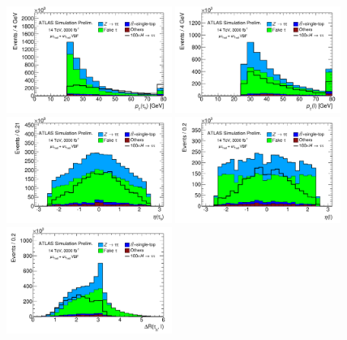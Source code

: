 \begin{figure}[tp]
  \centering
  \includegraphics[width=0.48\textwidth]{figures/ATL-PHYS-PUB-2014-018/fig_04a}
  \includegraphics[width=0.48\textwidth]{figures/ATL-PHYS-PUB-2014-018/fig_04b}
  \includegraphics[width=0.48\textwidth]{figures/ATL-PHYS-PUB-2014-018/fig_04c}
  \includegraphics[width=0.48\textwidth]{figures/ATL-PHYS-PUB-2014-018/fig_04d}
  \includegraphics[width=0.48\textwidth]{figures/ATL-PHYS-PUB-2014-018/fig_04e}

\end{figure}
